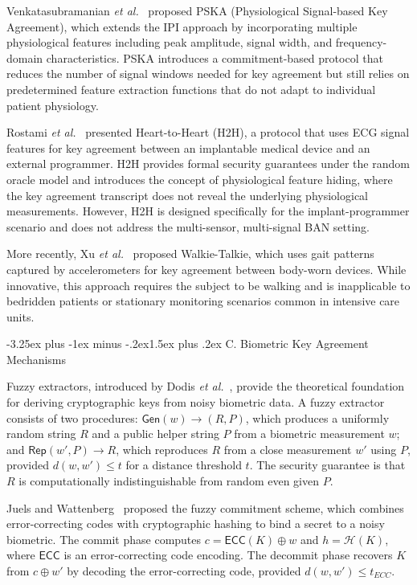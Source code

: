 \documentclass[10pt,twocolumn]{article}
\makeatletter
\renewcommand{\subsection}{\@startsection{subsection}{2}{\z@}%
  {-3.25ex plus -1ex minus -.2ex}{1.5ex plus .2ex}%
  {\normalfont\normalsize\bfseries\itshape}}
\newcommand{\etal}{\textit{et al.}}
\makeatother
\begin{document}
Venkatasubramanian \etal~\cite{venkatasubramanian2010pska} proposed PSKA (Physiological Signal-based Key Agreement), which extends the IPI approach by incorporating multiple physiological features including peak amplitude, signal width, and frequency-domain characteristics. PSKA introduces a commitment-based protocol that reduces the number of signal windows needed for key agreement but still relies on predetermined feature extraction functions that do not adapt to individual patient physiology.

Rostami \etal~\cite{rostami2013heart} presented Heart-to-Heart (H2H), a protocol that uses ECG signal features for key agreement between an implantable medical device and an external programmer. H2H provides formal security guarantees under the random oracle model and introduces the concept of physiological feature hiding, where the key agreement transcript does not reveal the underlying physiological measurements. However, H2H is designed specifically for the implant-programmer scenario and does not address the multi-sensor, multi-signal BAN setting.

More recently, Xu \etal~\cite{xu2017walkie} proposed Walkie-Talkie, which uses gait patterns captured by accelerometers for key agreement between body-worn devices. While innovative, this approach requires the subject to be walking and is inapplicable to bedridden patients or stationary monitoring scenarios common in intensive care units.

\subsection{C. Biometric Key Agreement Mechanisms}
\label{subsec:biometric}

Fuzzy extractors, introduced by Dodis \etal~\cite{dodis2008fuzzy}, provide the theoretical foundation for deriving cryptographic keys from noisy biometric data. A fuzzy extractor consists of two procedures: $\mathsf{Gen}(w) \rightarrow (R, P)$, which produces a uniformly random string $R$ and a public helper string $P$ from a biometric measurement $w$; and $\mathsf{Rep}(w', P) \rightarrow R$, which reproduces $R$ from a close measurement $w'$ using $P$, provided $d(w, w') \leq t$ for a distance threshold $t$. The security guarantee is that $R$ is computationally indistinguishable from random even given $P$.

Juels and Wattenberg~\cite{juels1999fuzzy} proposed the fuzzy commitment scheme, which combines error-correcting codes with cryptographic hashing to bind a secret to a noisy biometric. The commit phase computes $c = \mathsf{ECC}(K) \oplus w$ and $h = \mathcal{H}(K)$, where $\mathsf{ECC}$ is an error-correcting code encoding. The decommit phase recovers $K$ from $c \oplus w'$ by decoding the error-correcting code, provided $d(w, w') \leq t_{ECC}$.
\end{document}
